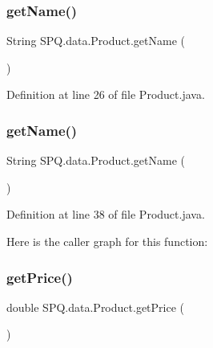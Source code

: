 \subsubsection{\texorpdfstring{get\+Name()}{getName()}\hspace{0.1cm}{\footnotesize\ttfamily [1/2]}}
{\footnotesize\ttfamily String S\+P\+Q.\+data.\+Product.\+get\+Name (\begin{DoxyParamCaption}{ }\end{DoxyParamCaption})}



Definition at line 26 of file Product.\+java.

\mbox{\label{class_s_p_q_1_1data_1_1_product_a03b62c19f01f4c231b742de9eba2ed25}} 
\subsubsection{\texorpdfstring{get\+Name()}{getName()}\hspace{0.1cm}{\footnotesize\ttfamily [2/2]}}
{\footnotesize\ttfamily String S\+P\+Q.\+data.\+Product.\+get\+Name (\begin{DoxyParamCaption}{ }\end{DoxyParamCaption})}



Definition at line 38 of file Product.\+java.

Here is the caller graph for this function\+:
\mbox{\label{class_s_p_q_1_1data_1_1_product_ad8200addd74d2e3b6ea9cfff4e8b8c7e}} 
\subsubsection{\texorpdfstring{get\+Price()}{getPrice()}\hspace{0.1cm}{\footnotesize\ttfamily [1/2]}}
{\footnotesize\ttfamily double S\+P\+Q.\+data.\+Product.\+get\+Price (\begin{DoxyParamCaption}{ }\end{DoxyParamCaption})}



